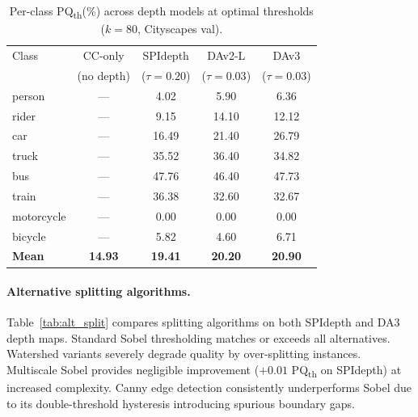 \documentclass{bmvc2k}
\newcommand{\pqt}{PQ\textsubscript{th}\xspace}
\begin{document}
\begin{table}[h]
\centering
\caption{Per-class \pqt (\%) across depth models at optimal thresholds ($k{=}80$, Cityscapes val).}
\label{tab:depth_perclass}
\small
\begin{tabular}{@{}lcccc@{}}
\toprule
Class & CC-only & SPIdepth & DAv2-L & DAv3 \\
 & (no depth) & ($\tau{=}0.20$) & ($\tau{=}0.03$) & ($\tau{=}0.03$) \\
\midrule
person & --- & 4.02 & 5.90 & 6.36 \\
rider & --- & 9.15 & 14.10 & 12.12 \\
car & --- & 16.49 & 21.40 & 26.79 \\
truck & --- & 35.52 & 36.40 & 34.82 \\
bus & --- & 47.76 & 46.40 & 47.73 \\
train & --- & 36.38 & 32.60 & 32.67 \\
motorcycle & --- & 0.00 & 0.00 & 0.00 \\
bicycle & --- & 5.82 & 4.60 & 6.71 \\
\midrule
\textbf{Mean} & \textbf{14.93} & \textbf{19.41} & \textbf{20.20} & \textbf{20.90} \\
\bottomrule
\end{tabular}
\end{table}

\paragraph{Alternative splitting algorithms.}
Table~\ref{tab:alt_split} compares splitting algorithms on both SPIdepth and DA3 depth maps. Standard Sobel thresholding matches or exceeds all alternatives. Watershed variants severely degrade quality by over-splitting instances. Multiscale Sobel provides negligible improvement ($+0.01$ \pqt on SPIdepth) at increased complexity. Canny edge detection consistently underperforms Sobel due to its double-threshold hysteresis introducing spurious boundary gaps.
\end{document}
